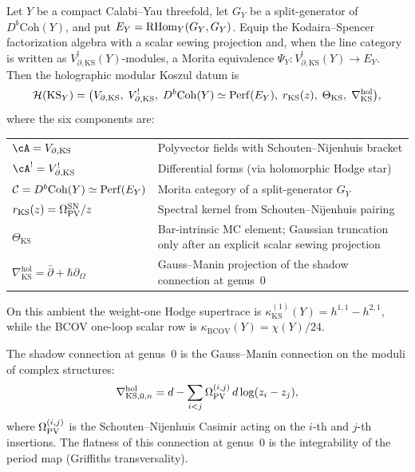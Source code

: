 \begin{theorem}
Let $Y$ be a compact Calabi--Yau threefold, let $G_Y$ be a
split-generator of $D^b\mathrm{Coh}(Y)$, and put
$E_Y=\operatorname{RHom}_Y(G_Y,G_Y)$. Equip the Kodaira--Spencer factorization
algebra with a scalar sewing projection and, when the line category is
written as $V_{\partial,\mathrm{KS}}^!(Y)$-modules, a Morita
equivalence $\Psi_Y\colon V_{\partial,\mathrm{KS}}^!(Y)\to E_Y$.
Then the holographic modular Koszul datum is
\begin{equation}%
\mathcal{H}(\mathrm{KS}_Y)
= \bigl(
V_{\partial,\mathrm{KS}},\;
V_{\partial,\mathrm{KS}}^!,\;
D^b\mathrm{Coh}(Y)\simeq\Perf(E_Y),\;
r_{\mathrm{KS}}(z),\;
\Theta_{\mathrm{KS}},\;
\nabla^{\mathrm{hol}}_{\mathrm{KS}}
\bigr),
\end{equation}
where the six components are:
\begin{center}
\renewcommand{\arraystretch}{1.25}
\begin{tabular}{lp{9cm}}
\hline
$\cA = V_{\partial,\mathrm{KS}}$
& Polyvector fields with Schouten--Nijenhuis bracket \\
$\cA^! = V^!_{\partial,\mathrm{KS}}$
& Differential forms (via holomorphic Hodge star) \\
$\mathcal C = D^b\mathrm{Coh}(Y)\simeq\operatorname{Perf}(E_Y)$
& Morita category of a split-generator $G_Y$ \\
$r_{\mathrm{KS}}(z)
= \Omega_{\operatorname{PV}}^{\mathrm{SN}}/z$
& Spectral kernel from Schouten--Nijenhuis pairing \\
$\Theta_{\mathrm{KS}}$
& Bar-intrinsic MC element; Gaussian truncation only after an
explicit scalar sewing projection \\
$\nabla^{\mathrm{hol}}_{\mathrm{KS}}
= \bar\partial + \hbar\partial_\Omega$
& Gauss--Manin projection of the shadow connection at
genus~$0$ \\
\hline
\end{tabular}
\end{center}
On this ambient the weight-one Hodge supertrace is
$\kappa_{\mathrm{KS}}^{(1)}(Y)=h^{1,1}-h^{2,1}$, while the BCOV
one-loop scalar row is
$\kappa_{\mathrm{BCOV}}(Y)=\chi(Y)/24$.

The shadow connection at genus~$0$ is the Gauss--Manin
connection on the moduli of complex structures:
\begin{equation}%
\nabla^{\mathrm{hol}}_{\mathrm{KS},0,n}
= d - \sum_{i<j}
\Omega_{\PV}^{(i,j)}\,d\log(z_i-z_j),
\end{equation}
where $\Omega_{\operatorname{PV}}^{(i,j)}$ is the Schouten--Nijenhuis Casimir
acting on the $i$-th and $j$-th insertions. The flatness of
this connection at genus~$0$ is the integrability of the period
map (Griffiths transversality).
\end{theorem}

